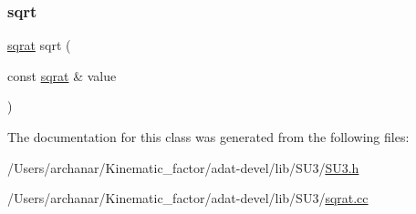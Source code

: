 \mbox{\label{classsqrat_aac93909598aa6f1b1b6bbe035a1af815}} 
\subsubsection{\texorpdfstring{sqrt}{sqrt}\hspace{0.1cm}{\footnotesize\ttfamily [3/3]}}
{\footnotesize\ttfamily \mbox{\hyperlink{classsqrat}{sqrat}} sqrt (\begin{DoxyParamCaption}\item[{const \mbox{\hyperlink{classsqrat}{sqrat}} \&}]{value }\end{DoxyParamCaption})\hspace{0.3cm}{\ttfamily [friend]}}



The documentation for this class was generated from the following files\+:\begin{DoxyCompactItemize}
\item 
/\+Users/archanar/\+Kinematic\+\_\+factor/adat-\/devel/lib/\+S\+U3/\mbox{\hyperlink{adat-devel_2lib_2SU3_2SU3_8h}{S\+U3.\+h}}\item 
/\+Users/archanar/\+Kinematic\+\_\+factor/adat-\/devel/lib/\+S\+U3/\mbox{\hyperlink{adat-devel_2lib_2SU3_2sqrat_8cc}{sqrat.\+cc}}\end{DoxyCompactItemize}
